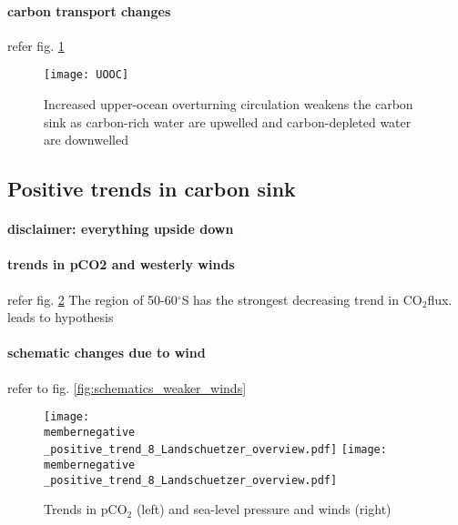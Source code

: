 \documentclass[12pt]{article}
\newcommand{\membernegative}{m143_1995_2002}
\begin{document}
\paragraph{carbon transport changes}
refer fig. \ref{fig:UOOC_neg}

\begin{figure}[h!]
	\centering
	\texttt{[image: UOOC]}
	\vspace{-5mm}
	\caption{Increased upper-ocean overturning circulation weakens the carbon sink as carbon-rich water are upwelled and carbon-depleted water are downwelled}%
	\label{fig:UOOC_neg}
\end{figure}













\clearpage

\subsection{Positive trends in carbon sink}

\paragraph{disclaimer: everything upside down}

\paragraph{trends in pCO2 and westerly winds} refer fig. \ref{fig:pCO2_pos} 
 The region of 50-60$^\circ$S has the strongest decreasing trend in CO$_2$flux. leads to hypothesis
 
\paragraph{schematic changes due to wind} refer to fig. \ref{fig:schematics_weaker_winds} 


\begin{figure}[h!]
	\centering
	\texttt{[image: \\membernegative \_positive\_trend\_8\_Landschuetzer\_overview.pdf]}
	\texttt{[image: \\membernegative \_positive\_trend\_8\_Landschuetzer\_overview.pdf]}
	\caption{Trends in pCO$_2$ (left) and sea-level pressure and winds (right)}
	\label{fig:pCO2_pos}
\end{figure}
\end{document}
